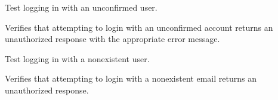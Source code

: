 \documentclass[letterpaper,10pt,openany,oneside,english]{sphinxmanual}
\begin{document}
\begin{savenotes}\begin{fulllineitems}
\label{\detokenize{modules/tests:storeapi.tests.routers.test_user.test_login_user_not_confirmed}}
\pysigstartsignatures
{}
\pysigstopsignatures
\sphinxAtStartPar
Test logging in with an unconfirmed user.

\sphinxAtStartPar
Verifies that attempting to login with an unconfirmed account returns
an unauthorized response with the appropriate error message.

\end{fulllineitems}\end{savenotes}


\begin{savenotes}\begin{fulllineitems}
\label{\detokenize{modules/tests:storeapi.tests.routers.test_user.test_login_user_not_exists}}
\pysigstartsignatures
{}
\pysigstopsignatures
\sphinxAtStartPar
Test logging in with a non\sphinxhyphen{}existent user.

\sphinxAtStartPar
Verifies that attempting to login with a non\sphinxhyphen{}existent email returns
an unauthorized response.

\end{fulllineitems}\end{savenotes}

\end{document}
